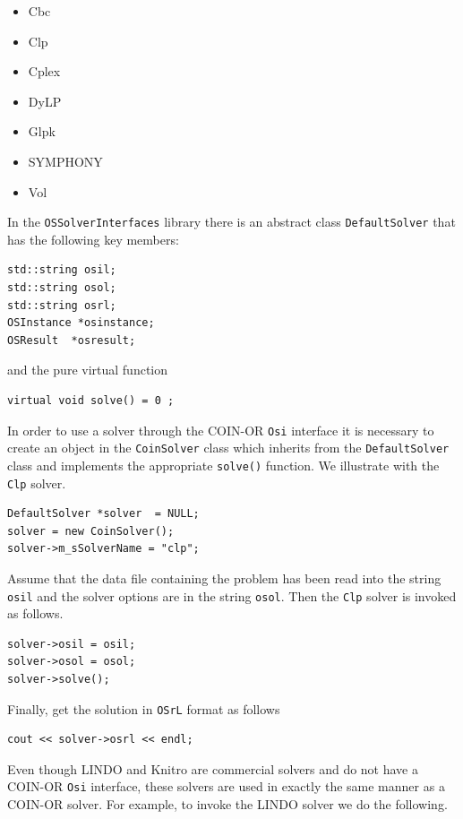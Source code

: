 \documentclass[11pt]{article}
\renewcommand{\_}{{\char"5F}}
\renewcommand{\{}{{\char"7B}}
\renewcommand{\}}{{\char"7D}}
\renewcommand{\^}{{\char"0D}}
\renewcommand{\'}{{\char"0D}}
\newif\ifknitro \knitrofalse    %
\begin{document}
\begin{enumerate}[Step 1:]
\begin{itemize}
\item Cbc
\item Clp
\item Cplex
\item DyLP
\item Glpk
\item SYMPHONY
\item Vol
\end{itemize}

In the {\tt OSSolverInterfaces} library there is an abstract class
{\tt DefaultSolver} that has the following key members:

\begin{verbatim}
std::string osil;
std::string osol;
std::string osrl;
OSInstance *osinstance;
OSResult  *osresult;
\end{verbatim}
and the pure virtual function
\begin{verbatim}
virtual void solve() = 0 ;
\end{verbatim}
In order to use a solver through the COIN-OR {\tt Osi} interface it is
necessary to create an object in the {\tt CoinSolver} class which inherits
from the {\tt DefaultSolver} class and implements the appropriate
{\tt solve()} function.  We illustrate with the {\tt Clp} solver.

\begin{verbatim}
DefaultSolver *solver  = NULL;
solver = new CoinSolver();
solver->m_sSolverName = "clp";
\end{verbatim}

Assume that the data file containing the problem has been read into
the string {\tt osil} and the solver options are in the string {\tt osol}.
Then the {\tt Clp} solver is invoked as follows.

\begin{verbatim}
solver->osil = osil;
solver->osol = osol;
solver->solve();
\end{verbatim}

Finally, get the solution in {\tt OSrL} format as follows

\begin{verbatim}
cout << solver->osrl << endl;
\end{verbatim}

\ifknitro   %
Even though LINDO and Knitro are commercial solvers and do not have a COIN-OR {\tt Osi} interface, these solvers are
used in exactly the same manner as a COIN-OR solver. For example, to invoke the LINDO solver we do the following.


\end{enumerate}
\end{document}
